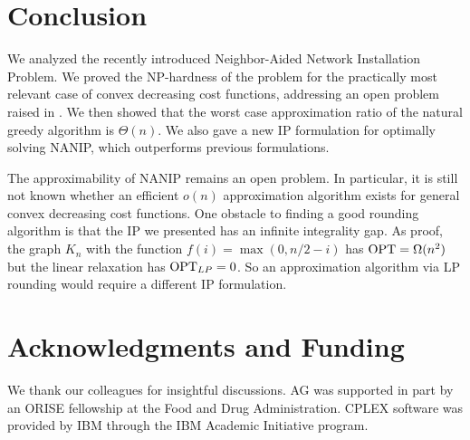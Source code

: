 \documentclass[english]{llncs}
\begin{document}
\section{Conclusion} \label{sec:concl}
We analyzed the recently introduced Neighbor-Aided Network Installation
Problem.  We proved the NP-hardness of the problem for the practically most
relevant case of convex decreasing cost functions, addressing an open problem
raised in \cite{Gutfraind14}.  We then showed that the worst case approximation
ratio of the natural greedy algorithm is $\Theta(n)$.  We also gave a new IP
formulation for optimally solving NANIP, which outperforms previous
formulations.

The approximability of NANIP remains an open problem. In particular, it is
still not known whether an efficient $o(n)$ approximation algorithm exists for
general convex decreasing cost functions. One obstacle to finding a good
rounding algorithm is that the IP we presented has an infinite integrality gap.
As proof, the graph $K_n$ with the function $f(i) = \max(0, n/2 - i)$ has
$\textup{OPT} = \Omega(n^2)$ but the linear relaxation has $\textup{OPT}_{LP} =
0$. So an approximation algorithm via LP rounding would require a different IP
formulation.

\section*{Acknowledgments and Funding}
We thank our colleagues for insightful discussions.
AG was supported in part by an ORISE fellowship at the Food and Drug Administration.
CPLEX software was provided by IBM through the IBM Academic Initiative program.



\end{document}

